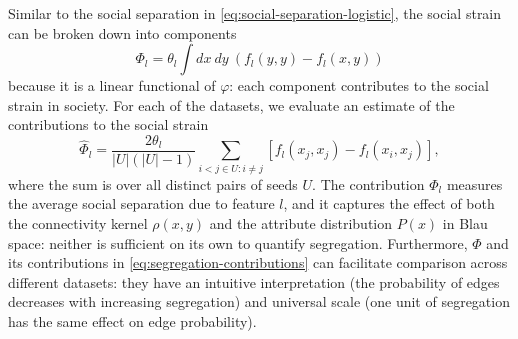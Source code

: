 \documentclass{scrartcl}
\newcommand{\card}[1]{\left|#1\right|}
\newcommand{\seeds}{U}
\begin{document}
Similar to the social separation in \cref{eq:social-separation-logistic}, the social strain can be broken down into components
\begin{equation}
    \Phi_l = \theta_l \int dx\ dy\ \left(f_l(y, y) - f_l(x, y)\right)\label{eq:segregation-contributions}
\end{equation}
because it is a linear functional of $\varphi$: each component contributes to the social strain in society. For each of the datasets, we evaluate an estimate of the contributions to the social strain
\[
    \hat\Phi_l = \frac{2\theta_l}{\card{\seeds}(\card{\seeds}-1)} \sum_{i < j\in\seeds:i\neq j} \left[f_l(x_j, x_j)-f_l(x_i, x_j)\right],
\]
where the sum is over all distinct pairs of seeds $\seeds$. The contribution $\Phi_l$ measures the average social separation due to feature $l$, and it captures the effect of both the connectivity kernel $\rho(x,y)$ and the attribute distribution $P(x)$ in Blau space: neither is sufficient on its own to quantify segregation. Furthermore, $\Phi$ and its contributions in \cref{eq:segregation-contributions} can facilitate comparison across different datasets: they have an intuitive interpretation (the probability of edges decreases with increasing segregation) and universal scale (one unit of segregation has the same effect on edge probability).

\end{document}
